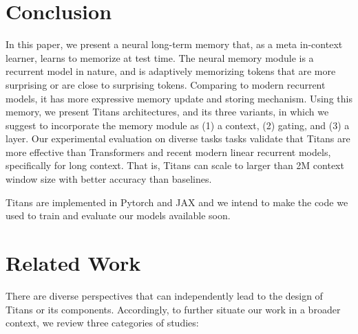 \documentclass{article}
\begin{document}
\section{Conclusion}\label{sec:concolusion}
In this paper, we present a neural long-term memory that, as a meta in-context learner, learns to memorize at test time. The neural memory module is a recurrent model in nature, and is adaptively memorizing tokens that are more surprising or are close to surprising tokens. Comparing to modern recurrent models, it has more expressive memory update and storing mechanism. Using this memory, we present Titans architectures, and its three variants, in which we suggest to incorporate the memory module as (1) a context, (2) gating, and (3) a layer.  Our experimental evaluation on diverse tasks tasks validate that Titans are more effective than Transformers and recent modern linear recurrent models, specifically for long context. That is, Titans can scale to larger than 2M context window size with better accuracy than baselines. 

Titans are implemented in Pytorch and JAX and we intend to make the code we used to train and evaluate our models available soon.

\newpage
\printbibliography

\appendix

\newpage
\section{Related Work}\label{app:rw}
There are diverse perspectives that can independently lead to the design of Titans or its components. Accordingly, to further situate our work in a broader context, we review three categories of studies:
\end{document}
